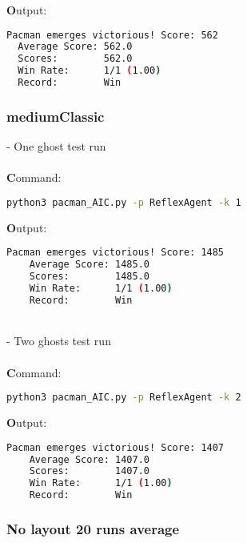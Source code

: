 \documentclass{article}
\begin{document}
\noindent\textbf Output:

\begin{lstlisting}[language=bash, frame=tlbr, framesep=6pt, backgroundcolor=\color{light-gray}]
  Pacman emerges victorious! Score: 562
  Average Score: 562.0
  Scores:        562.0
  Win Rate:      1/1 (1.00)
  Record:        Win
\end{lstlisting}

\subsubsection{mediumClassic}
\label{sec:mediumClassic}

- One ghost test run \\
~\\
\textbf Command:

\begin{lstlisting}[language=bash, frame=tlbr, framesep=6pt, backgroundcolor=\color{light-gray}]
    python3 pacman_AIC.py -p ReflexAgent -k 1
\end{lstlisting}

\noindent\textbf Output:

\begin{lstlisting}[language=bash, frame=tlbr, framesep=6pt, backgroundcolor=\color{light-gray}]
    Pacman emerges victorious! Score: 1485
    Average Score: 1485.0
    Scores:        1485.0
    Win Rate:      1/1 (1.00)
    Record:        Win
\end{lstlisting}

~\\
- Two ghosts test run \\
~\\
\textbf Command:

\begin{lstlisting}[language=bash, frame=tlbr, framesep=6pt, backgroundcolor=\color{light-gray}]
    python3 pacman_AIC.py -p ReflexAgent -k 2
\end{lstlisting}

\noindent\textbf Output:

\begin{lstlisting}[language=bash, frame=tlbr, framesep=6pt, backgroundcolor=\color{light-gray}]
    Pacman emerges victorious! Score: 1407
    Average Score: 1407.0
    Scores:        1407.0
    Win Rate:      1/1 (1.00)
    Record:        Win
\end{lstlisting}

\subsubsection{No layout 20 runs average}
\label{sec:20runs}
\end{document}
